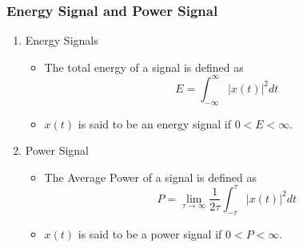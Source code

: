 \documentclass{article}
\begin{document}
\subsubsection{Energy Signal and Power Signal}
\begin{enumerate}
    \item Energy Signals
    \begin{itemize}
        \item The total energy of a signal is defined as 
        \[E = \int^{\infty}_{-\infty}|x(t)|^2dt\]
        \item $x(t)$ is said to be an energy signal if $0<E<\infty$.
    \end{itemize}
    \item Power Signal
    \begin{itemize}
        \item The Average Power of a signal is defined as
        \[P = \lim_{\tau\rightarrow\infty}\frac{1}{2\tau}\int^{\tau}_{-\tau}|x(t)|^2dt\]
        \item $x(t)$ is said to be a power signal if $0<P<\infty$.
    \end{itemize}
\end{enumerate}
\end{document}
